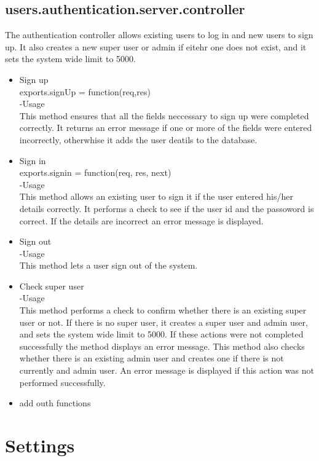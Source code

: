 \documentclass[a4paper,12pt]{article}
\begin{document}
 \subsection{users.authentication.server.controller}
 The authentication controller allows existing users to log in and new users to sign up. It also creates a new super user or admin if eitehr one does not exist, and it sets the system wide limit to 5000.
 \begin{itemize}
 \item Sign up\\
  exports.signUp = function(req,res)\\
  -Usage\\
  This method ensures that all the fields neccessary to sign up were completed correctly. It returns an error message if one or more of the fields were entered incorrectly, otherwhise it adds the user deatils to the database.
  \item Sign in\\
exports.signin = function(req, res, next) \\
-Usage\\
This method allows an existing user to sign it if the user entered his/her details correctly. It performs a check to see if the user id and the passoword is correct. If the details are incorrect an error message is displayed.
\item Sign out\\
-Usage\\
This method lets a user sign out of the system.
  \item Check super user\\
  -Usage\\
  This method performs a check to confirm whether there is an existing super user or not. If there is no super user, it creates a super user and admin user, and sets the system wide limit to 5000. If these actions were not completed successfully the method displays an error message. This method also checks whether there is an existing admin user and creates one if there is not currently and admin user. An error message is displayed if this action was not performed successfully.
  
  \item add outh functions
 \end{itemize}
 
 \section{Settings}
\end{document}
